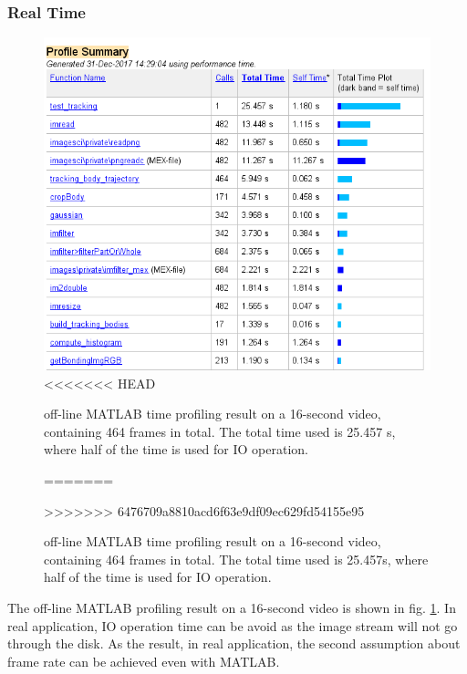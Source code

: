 \documentclass[11pt,twocolumn,letterpaper]{article}
\begin{document}
\subsubsection{Real Time}
\par
\begin{figure}[h]
      \centering
      \includegraphics[width=0.8\linewidth]{./Pic/time.png}
<<<<<<< HEAD
      \caption{off-line MATLAB time profiling result on a 16-second video, containing 464 frames in total. The total time used is 25.457 s, where half of the time is used for IO operation.}
=======
      \caption{off-line MATLAB time profiling result on a 16-second video, containing 464 frames in total. The total time used is 25.457s, where half of the time is used for IO operation.}
>>>>>>> 6476709a8810acd6f63e9df09ec629fd54155e95
\label{timing}      
\end{figure}
 The off-line MATLAB profiling result on a 16-second video is shown in fig. \ref{timing}.  In real application, IO operation time can be avoid as the image stream will not go through the disk. As the result, in real application, the second assumption about frame rate can be achieved even with MATLAB.
\end{document}
